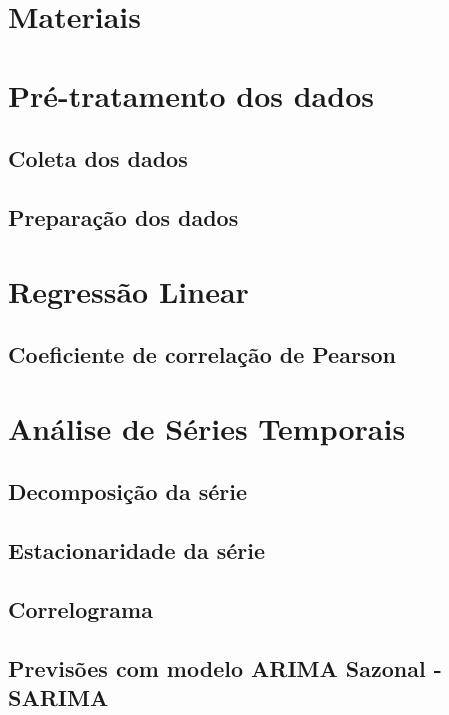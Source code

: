 \chapter{Materiais}

\lipsum[21-22]

\chapter{Pré-tratamento dos dados}

\section{Coleta dos dados}

\lipsum[21-22]

\section{Preparação dos dados}

\lipsum[24-25]

\chapter{Regressão Linear}

\lipsum[21-22]

\section{Coeficiente de correlação de Pearson}

\lipsum[21-22]

\chapter{Análise de Séries Temporais}

\lipsum[21-22]

\section{Decomposição da série}

\lipsum[21-22]

\section{Estacionaridade da série}

\lipsum[24-25]

\section{Correlograma}

\lipsum[24-25]

\section{Previsões com modelo ARIMA Sazonal - SARIMA}

\lipsum[24-25]